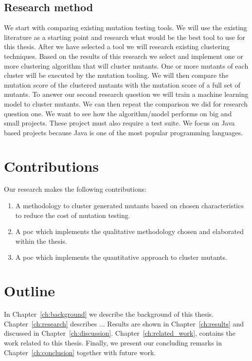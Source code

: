 \documentclass[../main]{subfiles}
\begin{document}
\subsection{Research method}
We start with comparing existing mutation testing tools. 
We will use the existing literature as a starting point and research what would be the best tool to use for this thesis.
\newline
After we have selected a tool we will research existing clustering techniques.
Based on the results of this research we select and implement one or more clustering algorithm that will cluster mutants. 
One or more mutants of each cluster will be executed by the mutation tooling.
We will then compare the mutation score of the clustered mutants with the mutation score of a full set of mutants.
\newline
To answer our second research question we will train a machine learning model to cluster mutants.
We can then repeat the comparison we did for research question one. 
\newline
We want to see how the algorithm/model performs on big and small projects.
These project must also require a test suite.
\newline
We focus on Java based projects because Java is one of the most popular programming languages\cite{Tiobe}.

\section{Contributions}
Our research makes the following contributions:
\begin{enumerate}
 \item A methodology to cluster generated mutants based on chosen characteristics to reduce the cost of mutation testing.
 \item A \acrfull{poc} which implements the qualitative methodology chosen and elaborated within the thesis.
 \item A \acrfull{poc} which implements the quantitative approach to cluster mutants. 
\end{enumerate}

\section{Outline}
In Chapter~\ref{ch:background} we describe the background of this thesis. 
Chapter~\ref{ch:research} describes ... 
Results are shown in Chapter~\ref{ch:results} and discussed in Chapter~\ref{ch:discussion}. Chapter~\ref{ch:related_work}, contains the work related to this thesis.
Finally, we present our concluding remarks in Chapter~\ref{ch:conclusion} together with future work.
\end{document}
